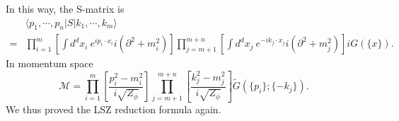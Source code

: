 \documentclass[aps,prb,superscriptaddress,nofootinbib]{revtex4}
\begin{document}
In this way, the S-matrix is
\begin{equation}
\begin{aligned}
	& \langle p_1, \cdots, p_n| S |k_1, \cdots, k_m\rangle  \\
	=& \prod_{i=1}^{m}\left[ \int d^dx_i \ e^{ip_i\cdot x_i}i(\partial^2+m_i^2)\right]
	\prod_{j=m+1}^{m+n}\left[\int d^dx_j \ e^{-ik_j\cdot x_j}i(\partial^2+m_j^2)\right] iG(\{x\}).
	\label{eq:K-G-LSZ}
\end{aligned}
\end{equation}
In momentum space
\begin{equation}
	\mathcal M = \prod_{i=1}^{m}\left[\frac{p_i^2-m_i^2}{i\sqrt{Z_\phi}}\right]
		\prod_{j=m+1}^{m+n}\left[\frac{k_j^2-m_j^2}{i\sqrt{Z_\phi}}\right]
		\tilde{G}(\{p_i\};\{-k_j\}).
\end{equation}
We thus proved the LSZ reduction formula again.
\end{document}
